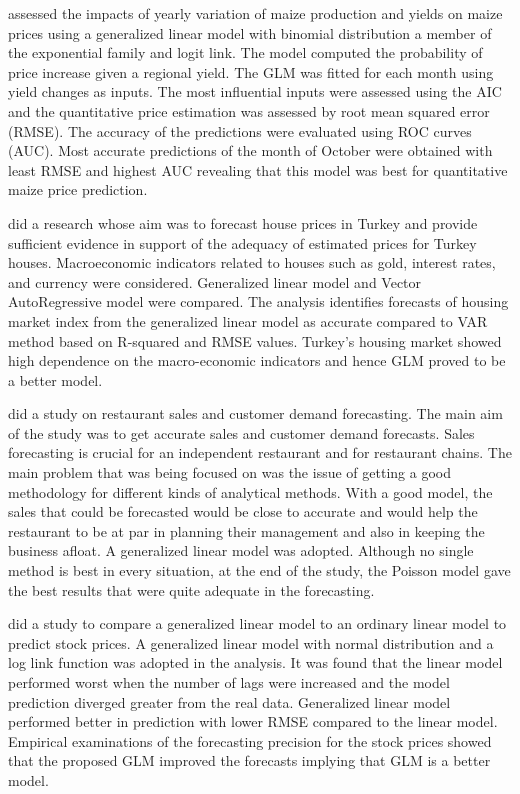\citet{zelingher2020assessing} assessed the impacts of yearly variation of maize production and yields on maize prices using a generalized linear model with binomial distribution a member of the exponential family and logit link. The model computed the probability of price increase given a regional yield. The GLM was fitted for each month using yield changes as inputs. The most influential inputs were assessed using the AIC and the quantitative price estimation was assessed by root mean squared error (RMSE). The accuracy of the predictions were evaluated using ROC curves (AUC). Most accurate predictions of the month of October were obtained with least RMSE  and highest AUC revealing that this model was best for quantitative maize price prediction.

\citet{yilmaz2020forecasting} did a research whose aim was to forecast house prices in Turkey and provide sufficient evidence in support of the adequacy of estimated prices for Turkey houses. Macroeconomic indicators related to houses such as gold, interest rates, and currency were considered. Generalized linear model and Vector AutoRegressive model were compared. The analysis identifies  forecasts of housing market index from the generalized linear model as accurate compared to VAR method based on R-squared and RMSE values. Turkey's housing market showed high dependence on the macro-economic indicators and hence GLM proved to be a better model.
 
\citet{lasek2019restaurant} did a study on restaurant sales and customer demand forecasting. The main aim of the study was to get accurate sales and customer demand forecasts. Sales forecasting is crucial for an independent restaurant and for restaurant chains. The main problem that was being focused on was the issue of getting a good methodology for different kinds of analytical methods. With a good model, the sales that could be forecasted would be close to accurate and would help the restaurant to be at par in planning their management and also in keeping the business afloat. A generalized linear model was adopted. Although no single method is best in every situation, at the end of the study, the Poisson model gave the best results that were quite adequate in the forecasting.

\citet{elliot2019time} did a study to compare a generalized linear model to an ordinary linear model to predict stock prices. A generalized linear model with normal distribution and a log link function was adopted in the analysis. It was found that the linear model performed worst when the number of lags were increased and the model prediction diverged greater from the real data. Generalized linear model performed better in prediction with lower RMSE compared to the linear model. Empirical examinations of the forecasting precision for the stock prices showed that the proposed GLM improved the forecasts implying that GLM is a better model.

